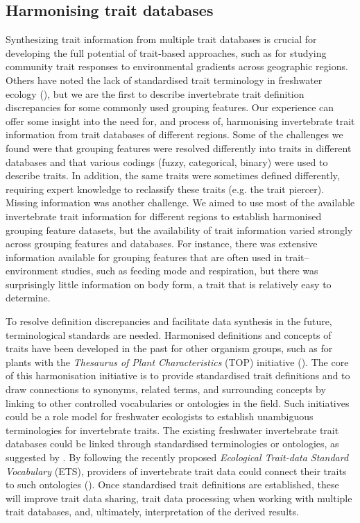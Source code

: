 \documentclass{article}
\begin{document}
\subsection*{Harmonising trait databases}

Synthesizing trait information from multiple trait databases is crucial for developing the full potential of trait-based approaches, such as for studying community trait responses to environmental gradients across geographic regions. Others have noted the lack of standardised trait terminology in freshwater ecology (\cite{baird_toward_2011, brink_traits-based_2011}), but we are the first to describe invertebrate trait definition discrepancies for some commonly used grouping features. Our experience can offer some insight into the need for, and process of, harmonising invertebrate trait information from trait databases of different regions. Some of the challenges we found were that grouping features were resolved differently into traits in different databases and that various codings (fuzzy, categorical, binary) were used to describe traits. In addition, the same traits were sometimes defined differently, requiring expert knowledge to reclassify these traits (e.g. the trait piercer). Missing information was another challenge. We aimed to use most of the available invertebrate trait information for different regions to establish harmonised grouping feature datasets, but the availability of trait information varied strongly across grouping features and databases. For instance, there was extensive information available for grouping features that are often used in trait–environment studies, such as feeding mode and respiration, but there was surprisingly little information on body form, a trait that is relatively easy to determine.

To resolve definition discrepancies and facilitate data synthesis in the future, terminological standards are needed. Harmonised definitions and concepts of traits have been developed in the past for other organism groups, such as for plants with the \textit{Thesaurus of Plant Characteristics} (TOP) initiative (\cite{garnier_towards_2017}). The core of this harmonisation initiative is to provide standardised trait definitions and to draw connections to synonyms, related terms, and surrounding concepts by linking to other controlled vocabularies or ontologies in the field. Such initiatives could be a role model for freshwater ecologists to establish unambiguous terminologies for invertebrate traits. The existing freshwater invertebrate trait databases could be linked through standardised terminologies or ontologies, as suggested by \citet{baird_toward_2011}. By following the recently proposed \textit{Ecological Trait-data Standard Vocabulary} (ETS), providers of invertebrate trait data could connect their traits to such ontologies (\cite{schneider_towards_2019}). Once standardised trait definitions are established, these will improve trait data sharing, trait data processing when working with multiple trait databases, and, ultimately, interpretation of the derived results. 
\end{document}
